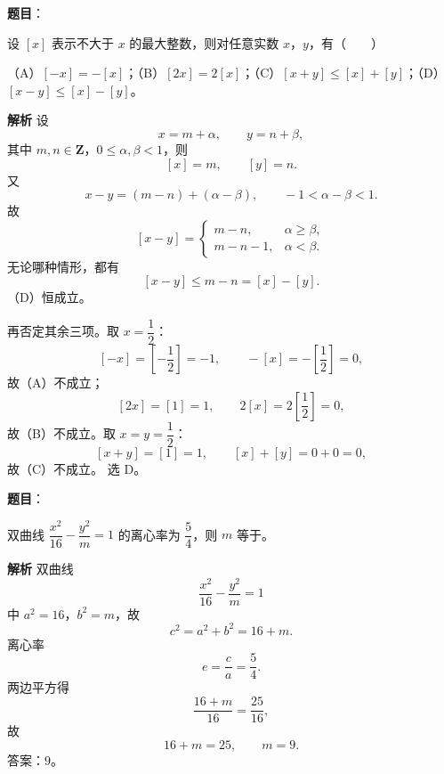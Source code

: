\begin{answer}

\textbf{题目}：

设 $[x]$ 表示不大于 $x$ 的最大整数，则对任意实数 $x$，$y$，有\mbox{（　　）}

（A）$[-x]=-[x]$；（B）$[2x]=2[x]$；（C）$[x+y]\leqslant[x]+[y]$；（D）$[x-y]\leqslant[x]-[y]$。

\textbf{解析}
设
\nopagebreak[4]
\[x=m+\alpha,\qquad y=n+\beta,\]
其中 $m,n\in\mathbf Z$，$0\leqslant\alpha,\beta<1$，则
\nopagebreak[4]
\[[x]=m,\qquad [y]=n.\]
又
\nopagebreak[4]
\[x-y=(m-n)+(\alpha-\beta),\qquad -1<\alpha-\beta<1.\]
故
\nopagebreak[4]
\[[x-y]=
\begin{cases}
m-n,&\alpha\geqslant\beta,\\
m-n-1,&\alpha<\beta.
\end{cases}\]
无论哪种情形，都有
\nopagebreak[4]
\[[x-y]\leqslant m-n=[x]-[y].\]
（D）恒成立。

再否定其余三项。取 $x=\dfrac12$：
\nopagebreak[4]
\[[-x]=\left[-\frac12\right]=-1,\qquad -[x]=-\left[\frac12\right]=0,\]
故（A）不成立；
\nopagebreak[4]
\[[2x]=[1]=1,\qquad 2[x]=2\left[\frac12\right]=0,\]
故（B）不成立。取 $x=y=\dfrac12$：
\nopagebreak[4]
\[[x+y]=[1]=1,\qquad [x]+[y]=0+0=0,\]
故（C）不成立。
选 D。


\end{answer}
\begin{answer}

\textbf{题目}：

双曲线 $\dfrac{x^2}{16}-\dfrac{y^2}{m}=1$ 的离心率为 $\dfrac54$，则 $m$ 等于\gkblank{}。

\textbf{解析}
双曲线
\nopagebreak[4]
\[\frac{x^2}{16}-\frac{y^2}{m}=1\]
中 $a^2=16$，$b^2=m$，故
\nopagebreak[4]
\[c^2=a^2+b^2=16+m.\]
离心率
\nopagebreak[4]
\[e=\frac ca=\frac54.\]
两边平方得
\nopagebreak[4]
\[\frac{16+m}{16}=\frac{25}{16},\]
故
\nopagebreak[4]
\[16+m=25,\qquad m=9.\]
答案：$9$。


\end{answer}
